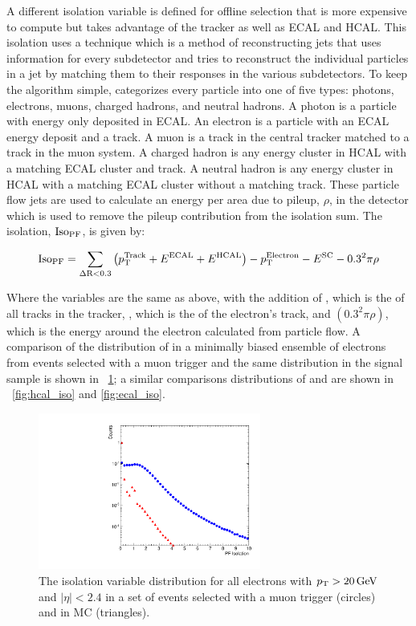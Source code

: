 A different isolation variable is defined for offline selection that is more
expensive to compute but takes advantage of the tracker as well as ECAL and
HCAL. This isolation uses a \particleflow\cite{particle_flow_2010} technique
which is a method of reconstructing jets that uses information for every
subdetector and tries to reconstruct the individual particles in a jet by
matching them to their responses in the various subdetectors. To keep the
algorithm simple, \particleflow categorizes every particle into one of five
types: photons, electrons, muons, charged hadrons, and neutral hadrons. A
photon is a particle with energy only deposited in ECAL. An electron is a
particle with an ECAL energy deposit and a track. A muon is a track in the
central tracker matched to a track in the muon system. A charged hadron is any
energy cluster in HCAL with a matching ECAL cluster and track. A neutral hadron
is any energy cluster in HCAL with a matching ECAL cluster without a matching
track. These particle flow jets are used to calculate an energy per area due to
pileup, $\rho$, in the detector which is used to remove the pileup contribution
from the isolation sum. The \particleflow isolation, $\text{Iso}_{\text{PF}}$, is given by:

\begin{equation}
    \text{Iso}_{\text{PF}} = \sum_{\Delta \text{R}<0.3} \left(p_{\mathrm{T}}^{\text{Track}} + E^{\text{ECAL}} + E^{\text{HCAL}}\right) - p_{\mathrm{T}}^{\text{Electron}}
    - E^{\text{SC}} - 0.3^{2} \pi \rho
\end{equation}

Where the variables are the same as above, with the addition of \ptTrack, which
is the \pt of all tracks in the tracker, \ptElectron, which is the \pt of the
electron's track, and $\left(0.3^{2} \pi \rho\right)$, which is the energy
around the electron calculated from particle flow. A comparison of the
distribution of \PFISO in a minimally biased ensemble of electrons from events
selected with a muon trigger and the same distribution in the \MADGRAPH signal
sample is shown in \FIG~\ref{fig:pf_iso}; a similar comparisons distributions
of \HCALISO and \ECALISO are shown in \FIGS~\ref{fig:hcal_iso} and
\ref{fig:ecal_iso}.

\begin{figure}[!htbp]
    \centering
    \includegraphics[width=0.65\textwidth]{figures/iso.pdf}
    \caption{
        The \particleflow isolation variable distribution for all electrons
        with $p_{\mathrm{T}} > 20 \,\text{Ge\hspace{-.08em}V}$ and $|\eta| < 2.4$ in a set of events selected
        with a muon trigger (circles) and in \MADGRAPH \Ztoee MC (triangles).
    }
    \label{fig:pf_iso}
\end{figure}

